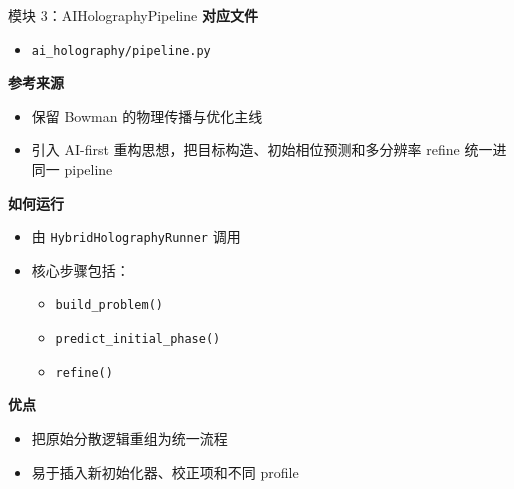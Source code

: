 \documentclass[aspectratio=169,10pt]{ctexbeamer}
\begin{document}
\begin{frame}{模块 3：AIHolographyPipeline}
  \textbf{对应文件}
  \begin{itemize}
    \item \texttt{ai\_holography/pipeline.py}
  \end{itemize}

  \textbf{参考来源}
  \begin{itemize}
    \item 保留 Bowman 的物理传播与优化主线
    \item 引入 AI-first 重构思想，把目标构造、初始相位预测和多分辨率 refine 统一进同一 pipeline
  \end{itemize}

  \textbf{如何运行}
  \begin{itemize}
    \item 由 \texttt{HybridHolographyRunner} 调用
    \item 核心步骤包括：
    \begin{itemize}
      \item \texttt{build\_problem()}
      \item \texttt{predict\_initial\_phase()}
      \item \texttt{refine()}
    \end{itemize}
  \end{itemize}

  \textbf{优点}
  \begin{itemize}
    \item 把原始分散逻辑重组为统一流程
    \item 易于插入新初始化器、校正项和不同 profile
  \end{itemize}
\end{frame}
\end{document}
